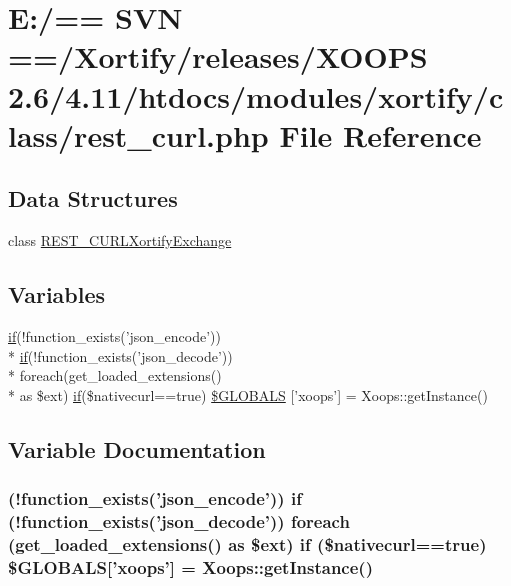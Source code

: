 \hypertarget{rest__curl_8php}{\section{E\-:/== S\-V\-N ==/\-Xortify/releases/\-X\-O\-O\-P\-S 2.6/4.11/htdocs/modules/xortify/class/rest\-\_\-curl.php File Reference}
\label{rest__curl_8php}
}
\subsection*{Data Structures}
\begin{DoxyCompactItemize}
\item 
class \hyperlink{class_r_e_s_t___c_u_r_l_xortify_exchange}{R\-E\-S\-T\-\_\-\-C\-U\-R\-L\-Xortify\-Exchange}
\end{DoxyCompactItemize}
\subsection*{Variables}
\begin{DoxyCompactItemize}
\item 
\hyperlink{poll_2index_8php_ae404acbb304be6b6ac443de921697faf}{if}(!function\-\_\-exists('json\-\_\-encode')) \\*
\hyperlink{poll_2index_8php_ae404acbb304be6b6ac443de921697faf}{if}(!function\-\_\-exists('json\-\_\-decode')) \\*
foreach(get\-\_\-loaded\-\_\-extensions() \\*
as \$ext) \hyperlink{poll_2index_8php_ae404acbb304be6b6ac443de921697faf}{if}(\$nativecurl==true) \hyperlink{rest__curl_8php_a8665f154810f15495d0d72726758b563}{\$\-G\-L\-O\-B\-A\-L\-S} \mbox{[}'xoops'\mbox{]} = Xoops\-::get\-Instance()
\end{DoxyCompactItemize}


\subsection{Variable Documentation}
\hypertarget{rest__curl_8php_a8665f154810f15495d0d72726758b563}{
\subsubsection[{\$\-G\-L\-O\-B\-A\-L\-S}]{ (!function\-\_\-exists('json\-\_\-encode')) {\bf if} (!function\-\_\-exists('json\-\_\-decode')) foreach (get\-\_\-loaded\-\_\-extensions() as \$ext) {\bf if} (\$nativecurl==true) \$G\-L\-O\-B\-A\-L\-S\mbox{[}'xoops'\mbox{]} = Xoops\-::get\-Instance()}}\label{rest__curl_8php_a8665f154810f15495d0d72726758b563}
